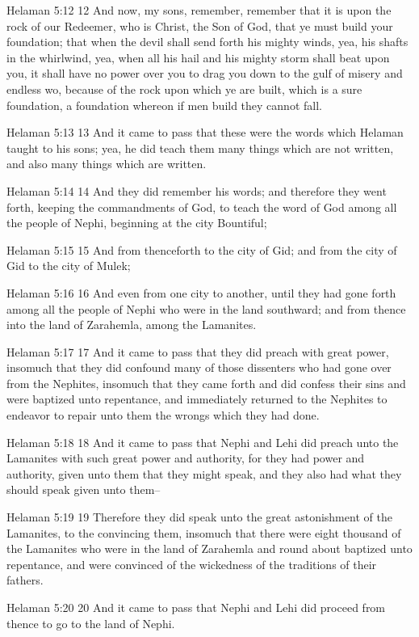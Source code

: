 Helaman 5:12
 12 And now, my sons, remember, remember that it is upon the rock
of our Redeemer, who is Christ, the Son of God, that ye must
build your foundation; that when the devil shall send forth his
mighty winds, yea, his shafts in the whirlwind, yea, when all his
hail and his mighty storm shall beat upon you, it shall have no
power over you to drag you down to the gulf of misery and endless
wo, because of the rock upon which ye are built, which is a sure
foundation, a foundation whereon if men build they cannot fall.

Helaman 5:13
 13 And it came to pass that these were the words which Helaman
taught to his sons; yea, he did teach them many things which are
not written, and also many things which are written.

Helaman 5:14
 14 And they did remember his words; and therefore they went
forth, keeping the commandments of God, to teach the word of God
among all the people of Nephi, beginning at the city Bountiful;

Helaman 5:15
 15 And from thenceforth to the city of Gid; and from the city of
Gid to the city of Mulek;

Helaman 5:16
 16 And even from one city to another, until they had gone forth
among all the people of Nephi who were in the land southward; and
from thence into the land of Zarahemla, among the Lamanites.

Helaman 5:17
 17 And it came to pass that they did preach with great power,
insomuch that they did confound many of those dissenters who had
gone over from the Nephites, insomuch that they came forth and
did confess their sins and were baptized unto repentance, and
immediately returned to the Nephites to endeavor to repair unto
them the wrongs which they had done.

Helaman 5:18
 18 And it came to pass that Nephi and Lehi did preach unto the
Lamanites with such great power and authority, for they had power
and authority, given unto them that they might speak, and they
also had what they should speak given unto them--

Helaman 5:19
 19 Therefore they did speak unto the great astonishment of the
Lamanites, to the convincing them, insomuch that there were eight
thousand of the Lamanites who were in the land of Zarahemla and
round about baptized unto repentance, and were convinced of the
wickedness of the traditions of their fathers.

Helaman 5:20
 20 And it came to pass that Nephi and Lehi did proceed from
thence to go to the land of Nephi.


